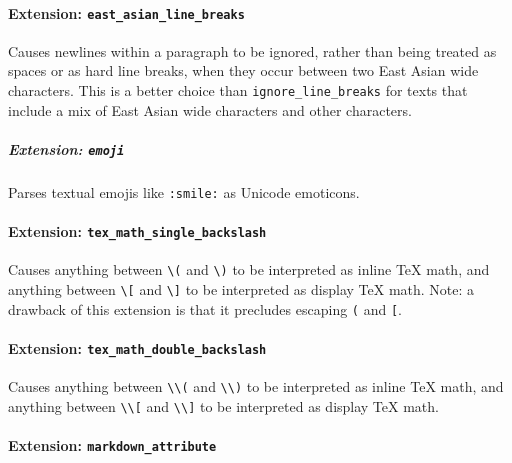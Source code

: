 \documentclass[]{article}
\let\oldparagraph\paragraph
\renewcommand{\paragraph}[1]{\oldparagraph{#1}\mbox{}}
\let\oldsubparagraph\subparagraph
\renewcommand{\subparagraph}[1]{\oldsubparagraph{#1}\mbox{}}
\begin{document}
\paragraph{\texorpdfstring{Extension:
\texttt{east\_asian\_line\_breaks}}{Extension: east\_asian\_line\_breaks}}\label{extension-east_asian_line_breaks}

Causes newlines within a paragraph to be ignored, rather than being
treated as spaces or as hard line breaks, when they occur between two
East Asian wide characters. This is a better choice than
\texttt{ignore\_line\_breaks} for texts that include a mix of East Asian
wide characters and other characters.

\subparagraph{\texorpdfstring{Extension:
\texttt{emoji}}{Extension: emoji}}\label{extension-emoji}

Parses textual emojis like \texttt{:smile:} as Unicode emoticons.

\paragraph{\texorpdfstring{Extension:
\texttt{tex\_math\_single\_backslash}}{Extension: tex\_math\_single\_backslash}}\label{extension-tex_math_single_backslash}

Causes anything between \texttt{\textbackslash{}(} and
\texttt{\textbackslash{})} to be interpreted as inline TeX math, and
anything between \texttt{\textbackslash{}{[}} and
\texttt{\textbackslash{}{]}} to be interpreted as display TeX math.
Note: a drawback of this extension is that it precludes escaping
\texttt{(} and \texttt{{[}}.

\paragraph{\texorpdfstring{Extension:
\texttt{tex\_math\_double\_backslash}}{Extension: tex\_math\_double\_backslash}}\label{extension-tex_math_double_backslash}

Causes anything between \texttt{\textbackslash{}\textbackslash{}(} and
\texttt{\textbackslash{}\textbackslash{})} to be interpreted as inline
TeX math, and anything between
\texttt{\textbackslash{}\textbackslash{}{[}} and
\texttt{\textbackslash{}\textbackslash{}{]}} to be interpreted as
display TeX math.

\paragraph{\texorpdfstring{Extension:
\texttt{markdown\_attribute}}{Extension: markdown\_attribute}}\label{extension-markdown_attribute}
\end{document}
